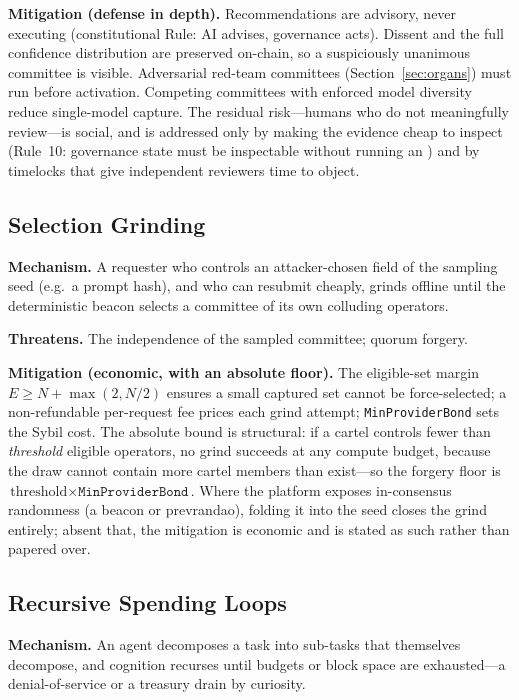 \textbf{Mitigation (defense in depth).} Recommendations are advisory, never executing (constitutional Rule: AI advises, governance acts). Dissent and the full confidence distribution are preserved on-chain, so a suspiciously unanimous committee is visible. Adversarial red-team committees (Section~\ref{sec:organs}) must run before activation. Competing committees with enforced model diversity reduce single-model capture. The residual risk---humans who do not meaningfully review---is social, and is addressed only by making the evidence cheap to inspect (Rule~10: governance state must be inspectable without running an \LLM{}) and by timelocks that give independent reviewers time to object.

\subsection{Selection Grinding}

\textbf{Mechanism.} A requester who controls an attacker-chosen field of the sampling seed (e.g.\ a prompt hash), and who can resubmit cheaply, grinds offline until the deterministic beacon selects a committee of its own colluding operators.

\textbf{Threatens.} The independence of the sampled committee; quorum forgery.

\textbf{Mitigation (economic, with an absolute floor).} The eligible-set margin $E \ge N + \max(2, N/2)$ ensures a small captured set cannot be force-selected; a non-refundable per-request fee prices each grind attempt; \texttt{MinProviderBond} sets the Sybil cost. The absolute bound is structural: if a cartel controls fewer than \emph{threshold} eligible operators, no grind succeeds at any compute budget, because the draw cannot contain more cartel members than exist---so the forgery floor is $\text{threshold} \times \texttt{MinProviderBond}$. Where the platform exposes in-consensus randomness (a beacon or prevrandao), folding it into the seed closes the grind entirely; absent that, the mitigation is economic and is stated as such rather than papered over.

\subsection{Recursive Spending Loops}

\textbf{Mechanism.} An agent decomposes a task into sub-tasks that themselves decompose, and cognition recurses until budgets or block space are exhausted---a denial-of-service or a treasury drain by curiosity.

